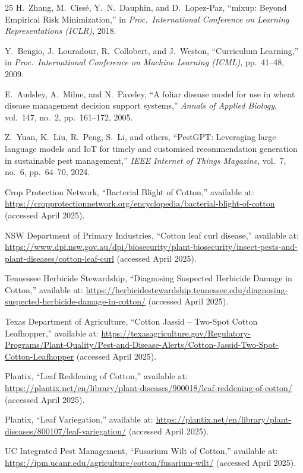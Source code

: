 \documentclass[12pt,a4paper]{report}
\begin{document}
\begin{thebibliography}{25}
H.~Zhang, M.~Ciss\'{e}, Y.~N.~Dauphin, and D.~Lopez-Paz,
``mixup: Beyond Empirical Risk Minimization,''
in \textit{Proc.\ International Conference on Learning Representations (ICLR)}, 2018.

Y.~Bengio, J.~Louradour, R.~Collobert, and J.~Weston,
``Curriculum Learning,''
in \textit{Proc.\ International Conference on Machine Learning (ICML)}, pp.~41--48, 2009.

E.~Audsley, A.~Milne, and N.~Paveley,
``A foliar disease model for use in wheat disease management decision support systems,''
\textit{Annals of Applied Biology}, vol.~147, no.~2, pp.~161--172, 2005.

Z.~Yuan, K.~Liu, R.~Peng, S.~Li, and others,
``PestGPT: Leveraging large language models and IoT for timely and customised recommendation generation in sustainable pest management,''
\textit{IEEE Internet of Things Magazine}, vol.~7, no.~6, pp.~64--70, 2024.

Crop Protection Network,
``Bacterial Blight of Cotton,''
available at: \url{https://cropprotectionnetwork.org/encyclopedia/bacterial-blight-of-cotton}
(accessed April 2025).

NSW Department of Primary Industries,
``Cotton leaf curl disease,''
available at: \url{https://www.dpi.nsw.gov.au/dpi/biosecurity/plant-biosecurity/insect-pests-and-plant-diseases/cotton-leaf-curl}
(accessed April 2025).

Tennessee Herbicide Stewardship,
``Diagnosing Suspected Herbicide Damage in Cotton,''
available at: \url{https://herbicidestewardship.tennessee.edu/diagnosing-suspected-herbicide-damage-in-cotton/}
(accessed April 2025).

Texas Department of Agriculture,
``Cotton Jassid -- Two-Spot Cotton Leafhopper,''
available at: \url{https://texasagriculture.gov/Regulatory-Programs/Plant-Quality/Pest-and-Disease-Alerts/Cotton-Jassid-Two-Spot-Cotton-Leafhopper}
(accessed April 2025).

Plantix,
``Leaf Reddening of Cotton,''
available at: \url{https://plantix.net/en/library/plant-diseases/900018/leaf-reddening-of-cotton/}
(accessed April 2025).

Plantix,
``Leaf Variegation,''
available at: \url{https://plantix.net/en/library/plant-diseases/800107/leaf-variegation/}
(accessed April 2025).

UC Integrated Pest Management,
``Fusarium Wilt of Cotton,''
available at: \url{https://ipm.ucanr.edu/agriculture/cotton/fusarium-wilt/}
(accessed April 2025).


\end{thebibliography}
\end{document}
